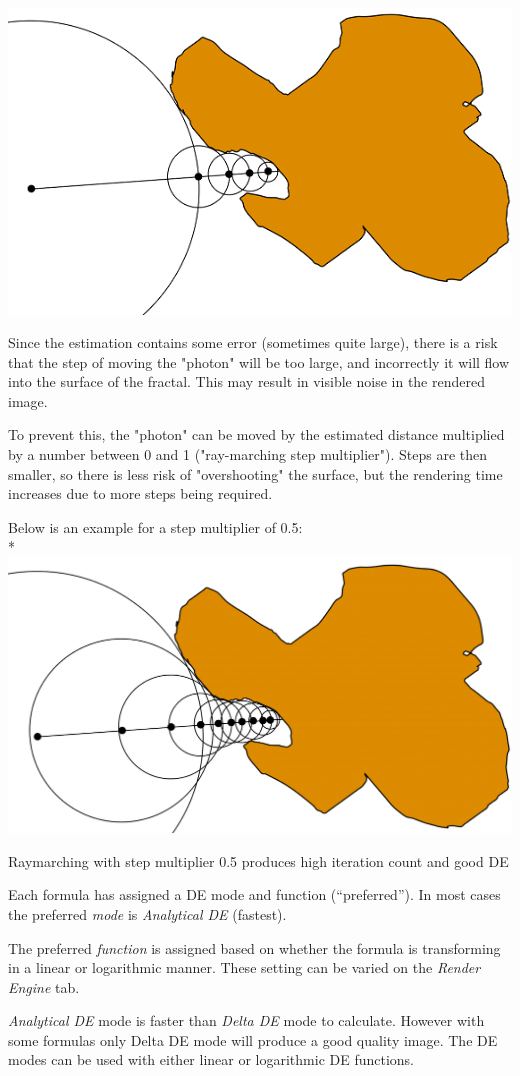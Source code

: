 \includegraphics[width=0.7\linewidth]{img/manual/media/distance_estimation_defactor_1.png}

Since the estimation contains some error (sometimes quite large), there is a
risk that the step of moving the "photon" will be too large, and incorrectly it
will flow into the surface of the fractal. This may result in visible noise in
the rendered image.

To prevent this, the "photon" can be moved by the estimated distance multiplied
by a number between 0 and 1 ("ray-marching step multiplier"). Steps are then
smaller, so there is less risk of "overshooting" the surface, but the rendering
time increases due to more steps being required.

Below is an example for a step multiplier of 0.5:\\*
\includegraphics[width=0.7\linewidth]{img/manual/media/distance_estimation_defactor_05}

Raymarching with step multiplier 0.5 produces high iteration count and good DE

Each formula has assigned a DE mode and function (``preferred''). In most cases
the preferred \emph{mode} is \emph{Analytical DE} (fastest).

The preferred \emph{function} is assigned based on whether the formula is
transforming in a linear or logarithmic manner. These setting can be varied on
the \emph{Render Engine} tab.

\emph{Analytical DE} mode is faster than \emph{Delta DE} mode to calculate.
However with some formulas only Delta DE mode will produce a good quality image.
The DE modes can be used with either linear or logarithmic DE functions.


